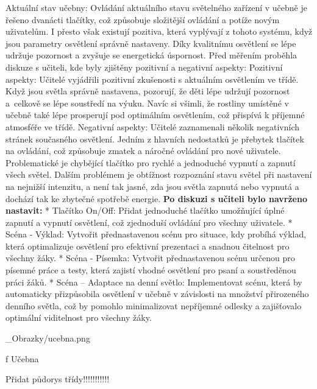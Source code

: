 \sec Aktuální stav učebny:
\medskip
Ovládání aktuálního stavu světelného zařízení v učebně je řešeno dvanácti tlačítky, což způsobuje složitější ovládání a potíže novým uživatelům. I přesto však existují pozitiva, která vyplývají z tohoto systému, když jsou parametry osvětlení správně nastaveny. Díky kvalitnímu osvětlení se lépe udržuje pozornost a zvyšuje se energetická úspornost.
Před měřením proběhla diskuze s učiteli, kde byly zjištěny pozitivní a negativní aspekty:
\medskip
{\sbf Pozitivní aspekty:}
Učitelé vyjádřili pozitivní zkušenosti s aktuálním osvětlením ve třídě. Když jsou světla správně nastavena, pozorují, že děti lépe udržují pozornost a~celkově se lépe soustředí na výuku. Navíc si všimli, že rostliny umístěné v učebně také lépe prosperují pod optimálním osvětlením, což přispívá k příjemné atmosféře ve třídě.
\medskip
{\sbf Negativní aspekty:}
Učitelé zaznamenali několik negativních stránek současného osvětlení. Jedním z hlavních nedostatků je přebytek tlačítek na ovládání, což způsobuje zmatek a náročné ovládání pro nové uživatele. Problematické je chybějící tlačítko pro rychlé a jednoduché vypnutí a zapnutí všech světel. Dalším problémem je obtížnost rozpoznání stavu světel při nastavení na nejnižší intenzitu, a není tak jasné, zda jsou světla zapnutá nebo vypnutá a dochází tak ke zbytečné spotřebě energie. 
\medskip
{\bf Po diskuzi s učiteli bylo navrženo nastavit:}
\medskip
\begitems
    * {\sbf Tlačítko On/Off:} Přidat jednoduché tlačítko umožňující úplné zapnutí a vypnutí osvětlení, což zjednoduší ovládání pro všechny uživatele.
\medskip
    * {\sbf Scéna - Výklad:} Vytvořit přednastavenou scénu pro situace, kdy probíhá výklad, která optimalizuje osvětlení pro efektivní prezentaci a snadnou čitelnost pro všechny žáky.
\medskip
    * {\sbf Scéna - Písemka:} Vytvořit přednastavenou scénu určenou pro písemné práce a testy, která zajistí vhodné osvětlení pro psaní a soustředěnou práci žáků.
\medskip
    * {\sbf Scéna – Adaptace na denní světlo:} Implementovat scénu, která by automaticky přizpůsobila osvětlení v učebně v závislosti na množství přirozeného denního světla, což by pomohlo minimalizovat nepříjemné odlesky a zajišťovalo optimální viditelnost pro všechny žáky.
\enditems

\medskip {}
\picw=15cm _Obrazky/ucebna.png
\caption/f Učebna
\medskip

Přidat půdorys třídy!!!!!!!!!!! 






